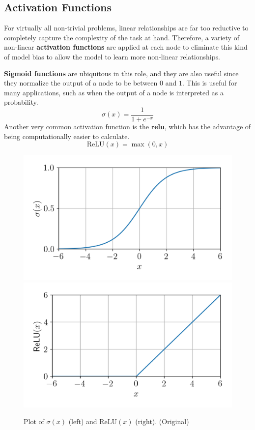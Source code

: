 \documentclass[12pt]{report}
\theoremstyle{definition}
\theoremstyle{remark}
\begin{document}
\subsection{Activation Functions}

For virtually all non-trivial problems, linear relationships are far too reductive to completely capture the complexity of the task at hand. Therefore, a variety of non-linear \textbf{activation functions} are applied at each node to eliminate this kind of model bias to allow the model to learn more non-linear relationships.

\textbf{Sigmoid functions} are ubiquitous in this role, and they are also useful since they normalize the output of a node to be between $0$ and $1$. This is useful for many applications, such as when the output of a node is interpreted as a probability.
\begin{equation}
    \sigma(x) = \frac{1}{1+e^{-x}}
\end{equation}
Another very common activation function is the \textbf{\gls{relu}}, which has the advantage of being computationally easier to calculate.
\begin{equation}
    \text{ReLU}(x) = \max(0,x)
\end{equation}
\begin{figure}[h]
    \centering
    \includegraphics[width=0.45\linewidth]{figs/sigmoid.png}
    \includegraphics[width=0.45\linewidth]{figs/relu.png}
    \caption{Plot of $\sigma(x)$ (left) and $\text{ReLU}(x)$ (right). (Original)}
    \label{fig:enter-label}
\end{figure}
\end{document}
